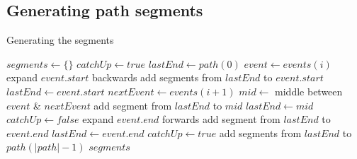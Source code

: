 \subsection{Generating path segments}
\begin{algorithm}
\caption{Generating the segments}
\label{alg:segments}
\begin{algorithmic}[1]
\State $segments \leftarrow \{\}$
\State $catchUp \leftarrow true$
\State $lastEnd \leftarrow path(0)$
\State $event \leftarrow events(i)$
	\State expand $event.start$ backwards
	\State add segments from $lastEnd$ to $event.start$
	\State $lastEnd \leftarrow event.start$
\EndIf
\State $nextEvent \leftarrow events(i+1)$
	\State $mid \leftarrow$ middle between $event$ \& $nextEvent$
	\State add segment from $lastEnd$ to $mid$
	\State $lastEnd \leftarrow mid$
	\State $catchUp \leftarrow false$
\Else
	\State expand $event.end$ forwards
	\State add segment from $lastEnd$ to $event.end$
	\State $lastEnd \leftarrow event.end$
	\State $catchUp \leftarrow true$
\EndIf
\EndFor
\State add segments from $lastEnd$ to $path(|path|-1)$
\Return $segments$
\EndFunction
\end{algorithmic}
\end{algorithm}




